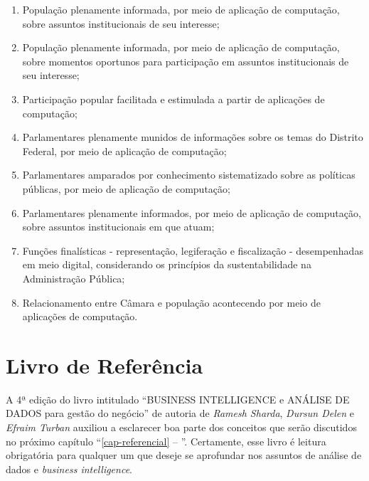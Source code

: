     \begin{enumerate}[label=\Alph*)]
        \item População plenamente informada, por meio de aplicação de computação, sobre assuntos institucionais de seu interesse;
        
        \item População plenamente informada, por meio de aplicação de computação, sobre momentos oportunos para participação em assuntos institucionais de seu interesse;
        
        \item Participação popular facilitada e estimulada a partir de aplicações de computação;
        
        \item Parlamentares plenamente munidos de informações sobre os temas do Distrito Federal, por meio de aplicação de computação;
        
        \item Parlamentares amparados por conhecimento sistematizado sobre as políticas públicas, por meio de aplicação de computação;
        
        \item Parlamentares plenamente informados, por meio de aplicação de computação, sobre assuntos institucionais em que atuam;
        
        \item Funções finalísticas - representação, legiferação e fiscalização - desempenhadas em meio digital, considerando os princípios da sustentabilidade na Administração Pública;
        
        \item Relacionamento entre Câmara e população acontecendo por meio de aplicações de computação.
    \end{enumerate}


\section{Livro de Referência}

A 4ª edição do livro intitulado ``BUSINESS INTELLIGENCE e ANÁLISE DE DADOS para gestão do negócio'' de autoria de \emph{Ramesh Sharda}, \emph{Dursun Delen} e \emph{Efraim Turban} \cite{turban2019} auxiliou a esclarecer boa parte dos conceitos que serão discutidos no próximo capítulo ``\autoref{cap-referencial} -- ''. Certamente, esse livro é leitura obrigatória para qualquer um que deseje se aprofundar nos assuntos de análise de dados e \emph{business intelligence}.

